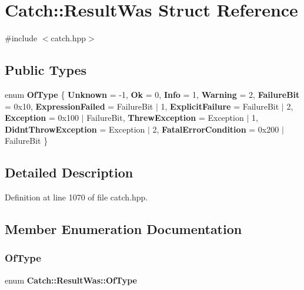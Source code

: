 \section{Catch\+::Result\+Was Struct Reference}
\label{struct_catch_1_1_result_was}


{\ttfamily \#include $<$catch.\+hpp$>$}

\subsection*{Public Types}
\begin{DoxyCompactItemize}
\item 
enum \textbf{ Of\+Type} \{ \newline
\textbf{ Unknown} = -\/1, 
\textbf{ Ok} = 0, 
\textbf{ Info} = 1, 
\textbf{ Warning} = 2, 
\newline
\textbf{ Failure\+Bit} = 0x10, 
\textbf{ Expression\+Failed} = Failure\+Bit $\vert$ 1, 
\textbf{ Explicit\+Failure} = Failure\+Bit $\vert$ 2, 
\textbf{ Exception} = 0x100 $\vert$ Failure\+Bit, 
\newline
\textbf{ Threw\+Exception} = Exception $\vert$ 1, 
\textbf{ Didnt\+Throw\+Exception} = Exception $\vert$ 2, 
\textbf{ Fatal\+Error\+Condition} = 0x200 $\vert$ Failure\+Bit
 \}
\end{DoxyCompactItemize}


\subsection{Detailed Description}


Definition at line 1070 of file catch.\+hpp.



\subsection{Member Enumeration Documentation}
\mbox{\label{struct_catch_1_1_result_was_a624e1ee3661fcf6094ceef1f654601ef}} 
\subsubsection{OfType}
{\footnotesize\ttfamily enum \textbf{ Catch\+::\+Result\+Was\+::\+Of\+Type}}

